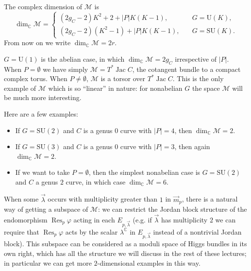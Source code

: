 \documentclass[12pt,letterpaper,reqno]{article}
\numberwithin{equation}{section}
\newcommand{\cM}{\ensuremath{\mathcal M}}
\newcommand{\C}{\ensuremath{\mathbb C}}
\newcommand{\abs}[1]{\lvert#1\rvert}
\DeclareMathOperator{\Jac}{Jac}
\DeclareMathOperator{\Res}{Res}
\newcommand{\SU}{\mathrm{SU}}
\newcommand{\U}{\mathrm{U}}
\begin{document}
\begin{remark}[Dimension of $\cM$]
The complex dimension of $\cM$ is
\begin{equation} \label{eq:dim-M}
  \dim_\C \cM = \begin{cases} (2g_C-2) K^2 + 2 + \abs{P} K(K-1), & \quad G = \U(K), \\ (2g_C-2) (K^2-1) + \abs{P} K(K-1), & \quad G = \SU(K). \end{cases}
\end{equation}
From now on we write $\dim_\C \cM = 2r$.
\end{remark}

\begin{example}
$G = \U(1)$ is the abelian case, in which $\dim_\C \cM = 2g_C$ irrespective
of $\abs{P}$. When $P = \emptyset$ we have simply $\cM = T^* \Jac C$, the cotangent
bundle to a compact complex torus. When $P \neq \emptyset$, $\cM$ is a torsor
over $T^* \Jac C$.
This is the only example of $\cM$ which is so ``linear'' in nature:
for nonabelian $G$ the space $\cM$ will be much more interesting.
\end{example}

\begin{example} Here are a few examples:
\begin{itemize}
\item If $G = \SU(2)$ and $C$ is a genus $0$ curve with $\abs{P} = 4$,
then $\dim_\C \cM = 2$.
\item If $G = \SU(3)$
and $C$ is a genus $0$ curve with $\abs{P}=3$,
then again $\dim_\C \cM = 2$.
\item If we want to take $P = \emptyset$,
then the simplest nonabelian case is
$G = \SU(2)$ and $C$ a genus $2$ curve, in which case
$\dim_\C \cM = 6$. 
\end{itemize}
\end{example}

\begin{remark}
When some $\vec\lambda$ occurs with multiplicity
greater than $1$ in $\vec{m}_p$, there 
is a natural way of getting a subspace of $\cM$:
we can restrict the Jordan block structure of
the endomorphism $\Res_p \varphi$
acting in each $E_{p,\vec\lambda}$ (e.g. if $\vec\lambda$ has
multiplicity $2$ we can require that $\Res_p \varphi$ acts
by the scalar $\lambda^\C$ in $E_{p,\vec\lambda}$ instead of
a nontrivial Jordan block). This subspace can be considered
as a moduli space of Higgs bundles in its own right, which
has all the structure we will discuss
in the rest of these lectures; 
in particular we can get
more $2$-dimensional examples in this way.
\end{remark}
\end{document}
